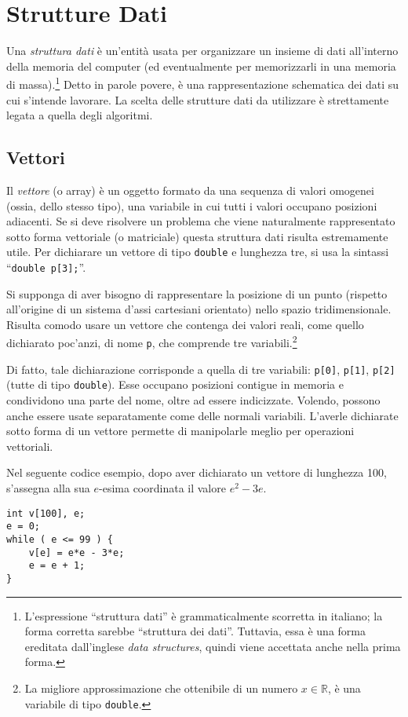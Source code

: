 	\section{Strutture Dati}
Una \emph{struttura dati} è un'entità usata per organizzare un insieme di dati all'interno della memoria del computer (ed eventualmente per memorizzarli in una memoria di massa).\footnote{L'espressione ``struttura dati'' è grammaticalmente scorretta in italiano; la forma corretta sarebbe ``struttura dei dati''.
Tuttavia, essa è una forma ereditata dall'inglese \emph{data structures}, quindi viene accettata anche nella prima forma.}
Detto in parole povere, è una rappresentazione schematica dei dati su cui s'intende lavorare.
La scelta delle strutture dati da utilizzare è strettamente legata a quella degli algoritmi.

		\subsection{Vettori}
		\label{subsec:array}
Il \emph{vettore} (o array) è un oggetto formato da una sequenza di valori omogenei (ossia, dello stesso tipo), una variabile in cui tutti i valori occupano posizioni adiacenti.
Se si deve risolvere un problema che viene naturalmente rappresentato sotto forma vettoriale (o matriciale) questa struttura dati risulta estremamente utile.
Per dichiarare un vettore di tipo \lstinline!double! e lunghezza tre, si usa la sintassi ``\lstinline!double p[3];!''.

Si supponga di aver bisogno di rappresentare la posizione di un punto (rispetto all'origine di un sistema d'assi cartesiani orientato) nello spazio tridimensionale.
Risulta comodo usare un vettore che contenga dei valori reali, come quello dichiarato poc'anzi, di nome \lstinline!p!, che comprende tre variabili.\footnote{La migliore approssimazione che ottenibile di un numero $x\in\mathbb{R}$, è una variabile di tipo \lstinline!double!.}

Di fatto, tale dichiarazione corrisponde a quella di tre variabili: \lstinline!p[0]!, \lstinline!p[1]!, \lstinline!p[2]! (tutte di tipo \lstinline!double!).
Esse occupano posizioni contigue in memoria e condividono una parte del nome, oltre ad essere indicizzate.
Volendo, possono anche essere usate separatamente come delle normali variabili.
L'averle dichiarate sotto forma di un vettore permette di manipolarle meglio per operazioni vettoriali.

Nel seguente codice esempio, dopo aver dichiarato un vettore di lunghezza \num{100}, s'assegna alla sua $e$-esima coordinata il valore $e^2-3e$.
\begin{lstlisting}
int v[100], e;
e = 0;
while ( e <= 99 ) {
	v[e] = e*e - 3*e;
	e = e + 1;
}
\end{lstlisting}


